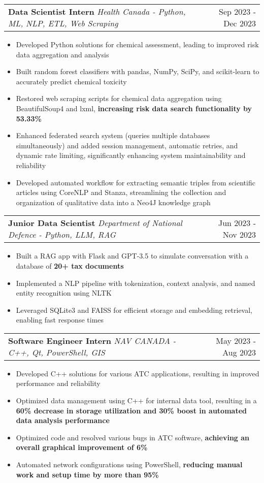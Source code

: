 \documentclass[letterpaper,11pt]{article}
\makeatletter
\newcommand{\resumeItem}[1]{
  \item\small{
    {#1 \vspace{-3pt}}
  }
}
\newcommand{\resumeSubheading}[3]{
    \item
    \begin{tabular*}{0.97\textwidth}[t]{l@{\extracolsep{\fill}}r}
      \textbf{#1} \textbar \textit{ #2} & #3 \\
    \end{tabular*}\vspace{-8.5pt}
}
\newcommand{\resumeItemListStart}{\begin{itemize}}
\newcommand{\resumeItemListEnd}{\end{itemize}\vspace{-5pt}}
\makeatother
\begin{document}
    \resumeSubheading
      {Data Scientist Intern}{Health Canada - Python, ML, NLP, ETL, Web Scraping}{Sep 2023 - Dec 2023}
      \resumeItemListStart
        \resumeItem{Developed Python solutions for chemical assessment, leading to improved risk data aggregation and analysis}
        \resumeItem{Built random forest classifiers with pandas, NumPy, SciPy, and scikit-learn to accurately predict chemical toxicity}
        \resumeItem{Restored web scraping scripts for chemical data aggregation using BeautifulSoup4 and lxml, \textbf{increasing risk data search functionality by 53.33\%}}
        \resumeItem{Enhanced federated search system (queries multiple databases simultaneously) and added session management, automatic retries, and dynamic rate limiting, significantly enhancing system maintainability and reliability}
        \resumeItem{Developed automated workflow for extracting semantic triples from scientific articles using CoreNLP and Stanza, streamlining the collection and organization of qualitative data into a Neo4J knowledge graph}
      \resumeItemListEnd

    \resumeSubheading
    {Junior Data Scientist}{Department of National Defence - Python, LLM, RAG}{Jun 2023 - Nov 2023}
      \resumeItemListStart
        \resumeItem{Built a RAG app with Flask and GPT-3.5 to simulate conversation with a database of \textbf{20+ tax documents}}
        \resumeItem{Implemented a NLP pipeline with tokenization, context analysis, and named entity recognition using NLTK}
        \resumeItem{Leveraged SQLite3 and FAISS for efficient storage and embedding retrieval, enabling fast response times}
      \resumeItemListEnd

    \resumeSubheading
    {Software Engineer Intern}{NAV CANADA - C++, Qt, PowerShell, GIS}{May 2023 - Aug 2023}
      \resumeItemListStart
        \resumeItem{Developed C++ solutions for various ATC applications, resulting in improved performance and reliability}
        \resumeItem{Optimized data management using C++ for internal data tool, resulting in a \textbf{60\% decrease in storage utilization and 30\% boost in automated data analysis performance}}
        \resumeItem{Optimized code and resolved various bugs in ATC software, \textbf{achieving an overall graphical improvement of 6\%}}
        \resumeItem{Automated network configurations using PowerShell, \textbf{reducing manual work and setup time by more than 95\%}}
      \resumeItemListEnd

\end{document}

